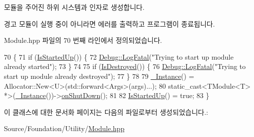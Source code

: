 모듈을 주어진 하위 시스템과 인자로 생성합니다. \begin{DoxyWarning}{경고}
모듈이 실행 중이 아니라면 에러를 출력하고 프로그램이 종료됩니다. 
\end{DoxyWarning}


Module.\+hpp 파일의 70 번째 라인에서 정의되었습니다.


\begin{DoxyCode}
70                                             \{
71             \textcolor{keywordflow}{if} (\hyperlink{classcpf_1_1_t_module_a73732afee7131dad652bf3e00c75cef9}{IsStartedUp}()) \{
72                 \hyperlink{classcpf_1_1_debug_a22849847c74bcb444922c263c9ae6183}{Debug::LogFatal}(\textcolor{stringliteral}{"Trying to start up module already started"});
73             \}
74 
75             \textcolor{keywordflow}{if} (\hyperlink{classcpf_1_1_t_module_a9f70f0a70ac59b13b7a874f82c877337}{IsDestroyed}()) \{
76                 \hyperlink{classcpf_1_1_debug_a22849847c74bcb444922c263c9ae6183}{Debug::LogFatal}(\textcolor{stringliteral}{"Trying to start up module already destroyed"});
77             \}
78 
79             \hyperlink{classcpf_1_1_t_module_a06ab8af8ea6b294959937fd2bbc1e615}{\_Instance}() = Allocator::New<U>(std::forward<Args>(args)...);
80             \textcolor{keyword}{static\_cast<}TModule<T> *\textcolor{keyword}{>}(\hyperlink{classcpf_1_1_t_module_a06ab8af8ea6b294959937fd2bbc1e615}{\_Instance}())->\hyperlink{classcpf_1_1_t_module_a15c93b1aca54022e145961bea8e3ea7d}{onShutDown}();
81 
82             \hyperlink{classcpf_1_1_t_module_a73732afee7131dad652bf3e00c75cef9}{IsStartedUp}() = \textcolor{keyword}{true};
83         \}
\end{DoxyCode}


이 클래스에 대한 문서화 페이지는 다음의 파일로부터 생성되었습니다.\+:\begin{DoxyCompactItemize}
\item 
Source/\+Foundation/\+Utility/\hyperlink{_module_8hpp}{Module.\+hpp}\end{DoxyCompactItemize}
